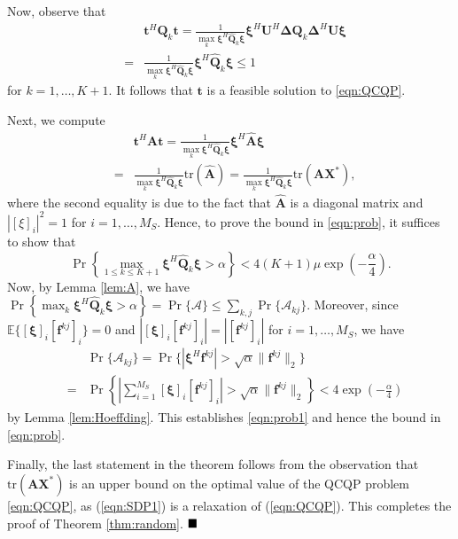 \documentclass[twocolumn,10pt]{IEEEtran}
\theoremstyle{plain} \newtheorem{theorem}{Theorem}
\theoremstyle{plain} \newtheorem{proposition}{Proposition}
\theoremstyle{plain} \newtheorem{corollary}{Corollary}
\theoremstyle{remark} \newtheorem{remark}{Remark}
\theoremstyle{remark} \newtheorem{lemma}{Lemma}
\theoremstyle{plain} \newtheorem{definition}{Definition}
\theoremstyle{plain} \newtheorem{assumption}{Assumption}
\theoremstyle{plain} \newtheorem{fact}{Fact}
\begin{document}
Now, observe that
\begin{eqnarray*}
&&\mathbf{t}^H\mathbf{Q}_k\mathbf{t} = \frac{1}{\max_k \mathbf{\xi}^H\widehat{\mathbf{Q}}_k\mathbf{\xi}}\mathbf{\xi}^H\mathbf{U}^H\mathbf{\Delta}\mathbf{Q}_k\mathbf{\Delta}^H\mathbf{U}\mathbf{\xi} \\
&=& \frac{1}{\max_k \mathbf{\xi}^H\widehat{\mathbf{Q}}_k\mathbf{\xi}}\mathbf{\xi}^H\widehat{\mathbf{Q}}_k\mathbf{\xi} \leq 1 
\end{eqnarray*}
for $k=1,\ldots,K+1$.  It follows that $\mathbf{t}$ is a feasible solution to \eqref{eqn:QCQP}.

Next, we compute
\begin{eqnarray*}
&& \mathbf{t}^H\mathbf{A}\mathbf{t} = \frac{1}{\max_k \mathbf{\xi}^H\widehat{\mathbf{Q}}_k\mathbf{\xi}}\mathbf{\xi}^H\widehat{\mathbf{A}}\mathbf{\xi} \\
&=& \frac{1}{\max_k \mathbf{\xi}^H\widehat{\mathbf{Q}}_k\mathbf{\xi}}\mathrm{tr}(\widehat{\mathbf{A}}) = \frac{1}{\max_k \mathbf{\xi}^H\widehat{\mathbf{Q}}_k\mathbf{\xi}}\mathrm{tr}(\mathbf{A}\mathbf{X}^*), 
\end{eqnarray*}
where the second equality is due to the fact that $\widehat{\mathbf{A}}$ is a diagonal matrix and $|[\xi]_i|^2=1$ for $i=1,\ldots,M_S$.  Hence, to prove the bound in \eqref{eqn:prob}, it suffices to show that
\begin{equation} \label{eqn:prob1}
   \Pr\left\{\max_{1\le k\le K+1} \mathbf{\xi}^H\widehat{\mathbf{Q}}_k\mathbf{\xi}>\alpha\right\} < 4(K+1)\mu \exp\left(-\frac{\alpha}{4}\right).
\end{equation}
Now, by Lemma \ref{lem:A}, we have $\Pr\left\{\max_k \mathbf{\xi}^H\widehat{\mathbf{Q}}_k\mathbf{\xi}>\alpha\right\}=\Pr\{\mathcal{A}\}\leq\sum_{k,j}\Pr\{\mathcal{A}_{kj}\}$.  Moreover, since $\mathbb{E}\{[\mathbf{\xi}]_i[\mathbf{f}^{kj}]_i\}=0$ and $|[\mathbf{\xi}]_i[\mathbf{f}^{kj}]_i|=|[\mathbf{f}^{kj}]_i|$ for $i=1,\ldots,M_S$, we have
\begin{eqnarray*}
 &&\Pr\{\mathcal{A}_{kj}\} = \Pr\{|\mathbf{\xi}^H\mathbf{f}^{kj}|>\sqrt{\alpha}\|\mathbf{f}^{kj}\|_2\} \\
& =& \Pr\left\{\left|\sum_{i=1}^{M_S}[\mathbf{\xi}]_i[\mathbf{f}^{kj}]_i\right|>\sqrt{\alpha}\|\mathbf{f}^{kj}\|_2\right\} < 4\exp\left(-\frac{\alpha}{4}\right) 
\end{eqnarray*}
by Lemma \ref{lem:Hoeffding}.  This establishes \eqref{eqn:prob1} and hence the bound in \eqref{eqn:prob}.

Finally, the last statement in the theorem follows from the observation that $\mathrm{tr}(\mathbf{A}\mathbf{X}^*)$ is an upper bound on the optimal value of the QCQP problem \eqref{eqn:QCQP}, as (\ref{eqn:SDP1}) is a relaxation of (\ref{eqn:QCQP}).  This completes the proof of Theorem \ref{thm:random}.
$\hfill\blacksquare$
\end{document}
